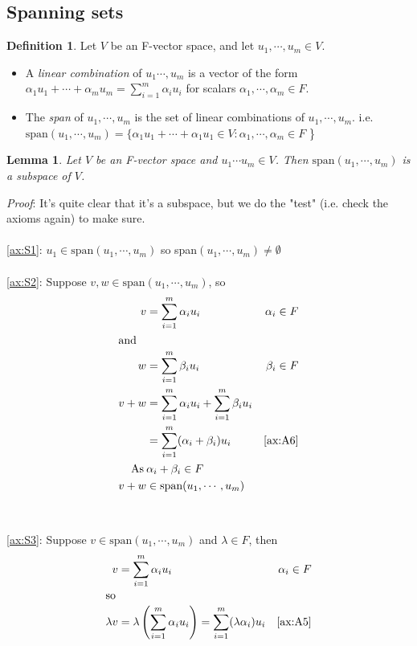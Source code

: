 \documentclass{report}
\newtheorem{lemma}[theorem]{Lemma}
\theoremstyle{remark}
\theoremstyle{definition}
\newtheorem{definition}[theorem]{Definition}
\theoremstyle{definition}
\theoremstyle{theorem}
\begin{document}
\subsection{Spanning sets}
\begin{definition}
Let $V$ be an F-vector space, and let $u_1,\cdots, u_m \in V$.
\begin{itemize}
    \item A \emph{linear combination} of $u_1 \cdots , u_m$ is a vector of the form $\alpha_1 u_1+ \cdots+ \alpha_m u_m = \sum^m_{i=1} \alpha_iu_i$ for scalars $\alpha_1 , \cdots, \alpha_m \in F$.
    \item The \emph{span} of $u_1, \cdots, u_m$ is the set of linear combinations of $u_1, \cdots, u_m$. i.e. $\text{span}(u_1, \cdots, u_m) = \{ \alpha_1u_1+ \cdots + \alpha_1u_1 \in V: \alpha_1, \cdots, \alpha_m \in F$ \}
\end{itemize}
\end{definition}
\begin{lemma}
Let $V$ be an F-vector space and $u_1 \cdots u_m \in V$. Then $\text{span}(u_1, \cdots, u_m)$ is a subspace of $V$.
\end{lemma}
\emph{Proof}: It's quite clear that it's a subspace, but we do the "test" (i.e. check the axioms again) to make sure. \\ \\
\ref{ax:S1}: $u_1 \in \text{span}(u_1, \cdots, u_m)$ so span$(u_1, \cdots, u_m) \neq \emptyset$ \\\\
\ref{ax:S2}: Suppose $v, w \in \text{span}(u_1, \cdots, u_m)$, so
\begin{align*}
    v &= \sum^m_{i=1} \alpha_iu_i & \alpha_i \in F\\
    \intertext{and}
    w &= \sum^m_{i=1} \beta_iu_i & \beta_i \in F\\
    v + w &= \sum^m_{i=1} \alpha_iu_i + \sum^m_{i=1} \beta_iu_i &\\
    &= \sum^m_{i=1} (\alpha_i + \beta_i)u_i & \eqref{ax:A6}\\
    \text{As} \> &\alpha_i + \beta_i \in F &\\
    v+w &\in \text{span}(u_1, \cdots, u_m) &
\end{align*}\\ \\
\ref{ax:S3}: Suppose $v \in \text{span}(u_1, \cdots, u_m)$ and $\lambda \in F$, then
\begin{align*}
    v &= \sum^m_{i=1}\alpha_iu_i & \alpha_i \in F\\
    \intertext{so}
    \lambda v &= \lambda\left( \sum^m_{i=1}\alpha_iu_i \right)
    = \sum^m_{i=1}(\lambda \alpha_i)u_i & \eqref{ax:A5}
\end{align*}
\end{document}
